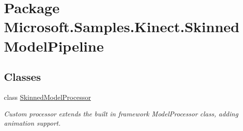 \hypertarget{namespace_microsoft_1_1_samples_1_1_kinect_1_1_skinned_model_pipeline}{\section{Package Microsoft.\+Samples.\+Kinect.\+Skinned\+Model\+Pipeline}
\label{namespace_microsoft_1_1_samples_1_1_kinect_1_1_skinned_model_pipeline}
}
\subsection*{Classes}
\begin{DoxyCompactItemize}
\item 
class \hyperlink{class_microsoft_1_1_samples_1_1_kinect_1_1_skinned_model_pipeline_1_1_skinned_model_processor}{Skinned\+Model\+Processor}
\begin{DoxyCompactList}\small\item\em Custom processor extends the built in framework Model\+Processor class, adding animation support. \end{DoxyCompactList}\end{DoxyCompactItemize}
